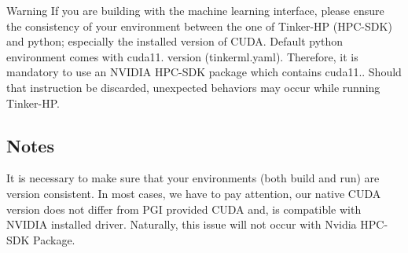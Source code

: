 \begin{DoxyWarning}{Warning}
If you are building with the machine learning interface, please ensure the consistency of your environment between the one of Tinker-\/\-H\-P (H\-P\-C-\/\-S\-D\-K) and python; especially the installed version of C\-U\-D\-A. Default python environment comes with cuda11. version {\ttfamily (tinkerml.\-yaml)}. Therefore, it is mandatory to use an N\-V\-I\-D\-I\-A H\-P\-C-\/\-S\-D\-K package which contains cuda11.. Should that instruction be discarded, unexpected behaviors may occur while running Tinker-\/\-H\-P.
\end{DoxyWarning}
\subsection*{Notes}

It is necessary to make sure that your environments (both build and run) are version consistent. In most cases, we have to pay attention, our native C\-U\-D\-A version does not differ from P\-G\-I provided C\-U\-D\-A and, is compatible with N\-V\-I\-D\-I\-A installed driver. Naturally, this issue will not occur with Nvidia H\-P\-C-\/\-S\-D\-K Package. 